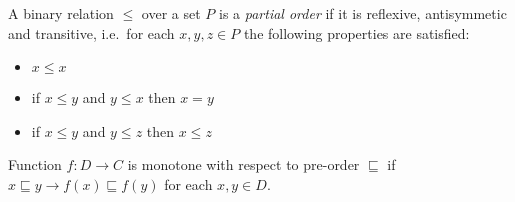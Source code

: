 \begin{defn}
A binary relation $\le$ over a set $P$ is a \emph{partial order} if it is reflexive, antisymmetic and transitive, i.e.\ for each $x, y, z \in P$ the following properties are satisfied:
\begin{itemize}
\item $x \le x$
\item if $x \le y$ and $y \le x$ then $x = y$
\item if $x \le y$ and $y \le z$ then $x \le z$
\end{itemize}
\end{defn}


\begin{defn}[Monotonicity]
Function $f: D \to C$ is monotone with respect to pre-order $\sqsubseteq$ if $x \sqsubseteq y \rightarrow f(x) \sqsubseteq f(y)$ for each $x, y \in D$.
\end{defn}

